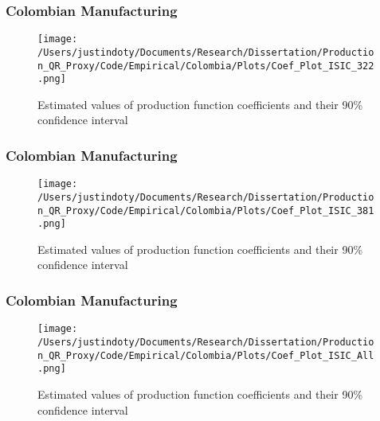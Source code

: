 \documentclass{beamer}
\begin{document}
\begin{frame}
\frametitle{Colombian Manufacturing}
\begin{figure}[ht]
\centering
\texttt{[image: /Users/justindoty/Documents/Research/Dissertation/Production\_QR\_Proxy/Code/Empirical/Colombia/Plots/Coef\_Plot\_ISIC\_322.png]}
\caption{Estimated values of production function coefficients and their 90\% confidence interval}
\end{figure}
\end{frame}

\begin{frame}
\frametitle{Colombian Manufacturing}
\begin{figure}[ht]
\centering
\texttt{[image: /Users/justindoty/Documents/Research/Dissertation/Production\_QR\_Proxy/Code/Empirical/Colombia/Plots/Coef\_Plot\_ISIC\_381.png]}
\caption{Estimated values of production function coefficients and their 90\% confidence interval}
\end{figure}
\end{frame}

\begin{frame}
\frametitle{Colombian Manufacturing}
\begin{figure}[ht]
\centering
\texttt{[image: /Users/justindoty/Documents/Research/Dissertation/Production\_QR\_Proxy/Code/Empirical/Colombia/Plots/Coef\_Plot\_ISIC\_All.png]}
\caption{Estimated values of production function coefficients and their 90\% confidence interval}
\end{figure}
\end{frame}
\end{document}

